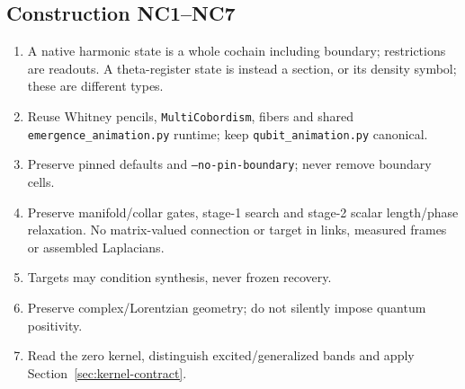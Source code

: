 \documentclass[11pt]{article}
\theoremstyle{definition}
\theoremstyle{remark}
\begin{document}
\subsection{Construction NC1--NC7}
\begin{enumerate}[label=NC\arabic*.,leftmargin=*]
\item A native harmonic state is a whole cochain including boundary;
restrictions are readouts. A theta-register state is instead a section,
or its density symbol; these are different types.
\item Reuse Whitney pencils, \texttt{MultiCobordism}, fibers and shared
\texttt{emergence\_animation.py} runtime; keep \texttt{qubit\_animation.py} canonical.
\item Preserve pinned defaults and \texttt{--no-pin-boundary}; never remove boundary cells.
\item Preserve manifold/collar gates, stage-1 search and stage-2 scalar
length/phase relaxation. No matrix-valued connection or target in links,
measured frames or assembled Laplacians.
\item Targets may condition synthesis, never frozen recovery.
\item Preserve complex/Lorentzian geometry; do not silently impose quantum positivity.
\item Read the zero kernel, distinguish excited/generalized bands and
apply Section~\ref{sec:kernel-contract}.
\end{enumerate}
\end{document}
